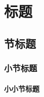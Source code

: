 \maketitle
\frontmatter

\tableofcontents

\mainmatter













\chapter{标题}
\section{节标题}
\subsection{小节标题}
\subsubsection{小小节标题}

\appendix



